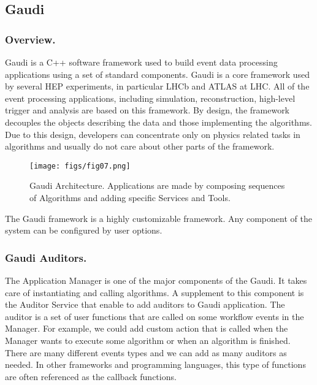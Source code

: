 \documentclass[a4paper]{jpconf}
\begin{document}
\subsection{Gaudi}

\subsubsection{Overview.}

Gaudi is a C++ software framework used to build event data processing applications using a set of standard components.  
Gaudi is a core framework used by several HEP experiments, in particular LHCb and ATLAS at LHC. 
All of the event processing applications, including simulation, reconstruction, high-level trigger and analysis 
are based on this framework. By design, the framework decouples the objects  describing the data and those 
implementing the algorithms. Due to this design,  developers can concentrate only on  physics related tasks 
in algorithms and usually do not care about other parts of the framework. 

\begin{figure}[H]
\begin{minipage}{\textwidth}
\texttt{[image: figs/fig07.png]}
\caption{\label{fig07}Gaudi Architecture. Applications are made by composing sequences of Algorithms and adding 
specific Services and Tools.}
\end{minipage}
\end{figure}

The Gaudi framework is a highly customizable framework. Any component of the system can be configured by user options. 

\subsubsection{Gaudi Auditors.}

The Application Manager is one of the major components of the Gaudi. It takes care of instantiating and
 calling algorithms. A supplement to this component  is the Auditor Service that enable to add auditors to 
 Gaudi application. The auditor is a set of user functions that are called on some workflow events in the Manager. 
 For example, we could add custom action that is called when the Manager wants to execute some algorithm or when 
 an algorithm is finished.  There are many different events types and we can add as many auditors as needed. 
 In other frameworks and programming languages, this type of functions are often referenced as the callback functions.
\end{document}
